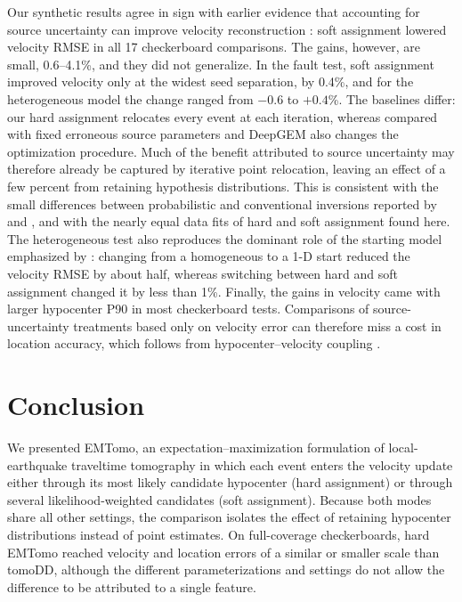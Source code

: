 \documentclass[12pt, a4paper]{article}
\begin{document}
Our synthetic results agree in sign with earlier evidence that accounting for source uncertainty can improve velocity reconstruction \parencite{gao2021,agata2026}: soft assignment lowered velocity RMSE in all 17 checkerboard comparisons. The gains, however, are small, 0.6--4.1\%, and they did not generalize. In the fault test, soft assignment improved velocity only at the widest seed separation, by 0.4\%, and for the heterogeneous model the change ranged from $-0.6$ to $+0.4$\%. The baselines differ: our hard assignment relocates every event at each iteration, whereas \textcite{agata2026} compared with fixed erroneous source parameters and DeepGEM also changes the optimization procedure. Much of the benefit attributed to source uncertainty may therefore already be captured by iterative point relocation, leaving an effect of a few percent from retaining hypothesis distributions. This is consistent with the small differences between probabilistic and conventional inversions reported by \textcite{pianaagostinetti2015} and \textcite{ryberg2019}, and with the nearly equal data fits of hard and soft assignment found here. The heterogeneous test also reproduces the dominant role of the starting model emphasized by \textcite{kissling1994}: changing from a homogeneous to a 1-D start reduced the velocity RMSE by about half, whereas switching between hard and soft assignment changed it by less than 1\%. Finally, the gains in velocity came with larger hypocenter P90 in most checkerboard tests. Comparisons of source-uncertainty treatments based only on velocity error can therefore miss a cost in location accuracy, which follows from hypocenter--velocity coupling \parencite{thurber1992}.

\section{Conclusion}
\label{sec:conclusion}

We presented EMTomo, an expectation--maximization formulation of local-earthquake traveltime tomography in which each event enters the velocity update either through its most likely candidate hypocenter (hard assignment) or through several likelihood-weighted candidates (soft assignment). Because both modes share all other settings, the comparison isolates the effect of retaining hypocenter distributions instead of point estimates. On full-coverage checkerboards, hard EMTomo reached velocity and location errors of a similar or smaller scale than tomoDD, although the different parameterizations and settings do not allow the difference to be attributed to a single feature.
\end{document}
